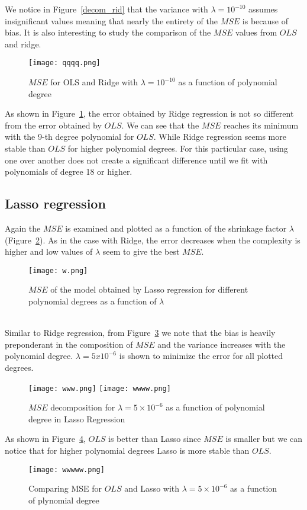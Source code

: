 \documentclass{emulateapj}
\begin{document}
We notice in Figure~\ref{decom_rid} that the variance with $\lambda=10^{-10}$ assumes insignificant values meaning that nearly the entirety of the $MSE$ is because of bias. It is also interesting to study the comparison of the $MSE$ values from $OLS$ and ridge.
\begin{figure}[H]
\centering
\caption{$MSE$ for OLS and Ridge with $\lambda=10^{-10}$ as a function of polynomial degree}
\texttt{[image: qqqq.png]}
\label{OLS_ridge}
\end{figure}
As shown in Figure~\ref{OLS_ridge}, the error obtained by Ridge regression is not so different from the error obtained by $OLS$. We can see that the $MSE$ reaches its minimum with the 9-th degree polynomial for $OLS$. While Ridge regression seems more stable than $OLS$ for higher polynomial degrees. For this particular case, using one over another does not create a significant difference until we fit with polynomials of degree 18 or higher.


\subsection{Lasso regression}
Again the $MSE$ is examined and plotted as a function of the shrinkage factor $\lambda$ (Figure~\ref{mse_lasso}). As in the case with Ridge, the error decreases when the complexity is higher and low values of $\lambda$ seem to give the best $MSE$.
\begin{figure}[h]
    \centering
    \texttt{[image: w.png]}
    \caption{$MSE$ of the model obtained by Lasso regression for different polynomial degrees as a function of $\lambda$}
    \label{mse_lasso}
\end{figure}
\\Similar to Ridge regression, from Figure~\ref{deco_lasso}  we note that the bias is heavily preponderant in the composition of $MSE$ and the variance increases with the polynomial degree. $\lambda = 5x10^{-6}$ is shown to minimize the error for all plotted degrees.
\begin{figure}[H]
    \centering
    \texttt{[image: www.png]}
    \texttt{[image: wwww.png]}
    \caption{$MSE$ decomposition for $\lambda=5\times10^{-6}$ as a function of polynomial degree in Lasso Regression}
    \label{deco_lasso}
\end{figure}
As shown in Figure~\ref{ols_lasso}, $OLS$ is better than Lasso since $MSE$ is smaller but we can notice that for higher polynomial degrees Lasso is more stable than $OLS$.
\begin{figure}[H]
    \centering
    \texttt{[image: wwwww.png]}
    \caption{Comparing MSE for $OLS$ and Lasso with $\lambda=5\times10^{-6}$ as a function of plynomial degree}
    \label{ols_lasso}
\end{figure}
\end{document}
